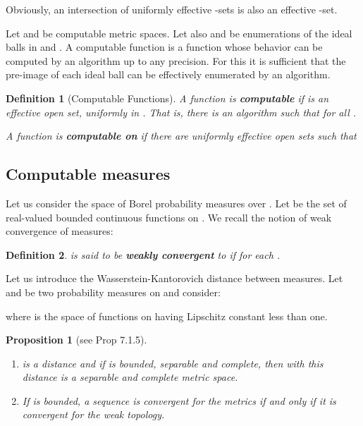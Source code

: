 \documentclass[copyright,creativecommons]{eptcs}
\newtheorem{definition}{Definition}
\newtheorem{proposition}{Proposition}
\numberwithin{equation}{section}
\begin{document}
Obviously, an intersection of uniformly effective -sets is also
an effective -set.

Let  and  be computable metric spaces. Let also  and  be enumerations of the ideal balls in  and . A computable function  is a function whose behavior can be
computed by an algorithm up to any precision. For this it is sufficient that
the pre-image of each ideal ball can be effectively enumerated by an
algorithm.

\begin{definition}[Computable Functions]
\label{comp_func} A function  is \textbf{\emph{computable}}
if  is an effective open set, uniformly in . That is,
there is an algorithm  such that 
for all .

\noindent A function  is \textbf{\emph{computable on }} if there are uniformly effective open sets  such that

\end{definition}

\subsection{Computable measures\label{seccompmu}}

Let us consider the space  of Borel probability measures over .
Let  be the set of real-valued bounded continuous functions on . We recall the notion of weak convergence of measures:

\begin{definition}
 is said to be \emph{\textbf{weakly convergent}} to  if  for each
.
\end{definition}

Let us introduce the Wasserstein-Kantorovich distance between measures. Let  and  be two probability measures on  and consider:



\noindent where  is the space of functions on  having
Lipschitz constant less than one.

\begin{proposition}[see \protect\cite{AGS} Prop 7.1.5]
\label{ambros}\mbox{}

\begin{enumerate}
\item  is a distance and if  is bounded, separable and complete,
then  with this distance is a separable and complete metric space.

\item If  is bounded, a sequence is convergent for the  metrics if
and only if it is convergent for the weak topology.
\end{enumerate}
\end{proposition}
\end{document}
